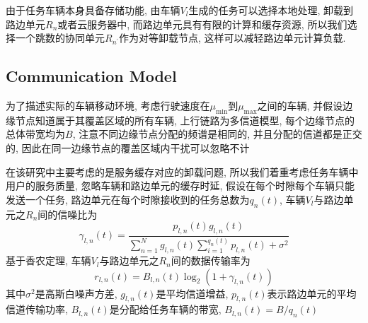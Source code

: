 \documentclass[lettersize,journal]{IEEEtran}
\begin{document}
{{由于任务车辆本身具备存储功能, 由车辆$ V_l $生成的任务可以选择本地处理, 卸载到路边单元$ R_n $或者云服务器中, 而路边单元具有有限的计算和缓存资源, 所以我们选择一个跳数的协同单元$ R_{n^{\prime}} $作为对等卸载节点, 这样可以减轻路边单元计算负载.
\subsection{Communication Model}
为了描述实际的车辆移动环境, 考虑行驶速度在$\mu_{\min}$到$\mu_{\max}$之间的车辆, 并假设边缘节点知道属于其覆盖区域的所有车辆, 上行链路为多信道模型, 每个边缘节点的总体带宽均为$ B $, 注意不同边缘节点分配的频谱是相同的, 并且分配的信道都是正交的, 因此在同一边缘节点的覆盖区域内干扰可以忽略不计

在该研究中主要考虑的是服务缓存对应的卸载问题, 所以我们着重考虑任务车辆中用户的服务质量, 忽略车辆和路边单元的缓存时延, 假设在每个时隙每个车辆只能发送一个任务, 路边单元在每个时隙接收到的任务总数为$ q_n(t) $,  车辆$ V_l $与路边单元之$ R_n $间的信噪比为
\begin{equation}
	\gamma_{l,n}(t) =\frac{p_{l,n}(t)g_{l,n}(t)}{\sum_{n=1}^{N}g_{l,n}(t)\sum_{i=1}^{q_n(t)}p_{l,n}(t) + \sigma ^2}
	\label{SINR} 
\end{equation}
基于香农定理, 车辆$ V_l $与路边单元之$ R_n $间的数据传输率为
\begin{equation}
	r_{l,n}(t) = B_{l,n}(t)\log_2( 1+\gamma_{l,n}(t) )
	\label{transmission rate}
\end{equation}
其中$ \sigma^2 $是高斯白噪声方差, $ g_{l,n}(t) $是平均信道增益, $ p_{l,n}(t) $表示路边单元的平均信道传输功率, $ B_{l,n}(t) $是分配给任务车辆的带宽, $ B_{l,n}(t) =B/q_n(t)  $





%






}}
\end{document}
